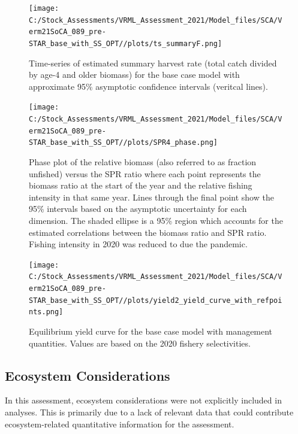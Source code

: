 \documentclass[11pt,
  english,
  a4paper,
]{article}
\begin{document}
\begin{figure}
\centering
\texttt{[image: C:/Stock\_Assessments/VRML\_Assessment\_2021/Model\_files/SCA/Verm21SoCA\_089\_pre-STAR\_base\_with\_SS\_OPT//plots/ts\_summaryF.png]}
\caption{Time-series of estimated summary harvest rate (total catch divided by age-4 and older biomass) for the base case model with approximate 95\% asymptotic confidence intervals (veritcal lines).\label{fig:FmortalityES}}
\end{figure}

\begin{figure}
\centering
\texttt{[image: C:/Stock\_Assessments/VRML\_Assessment\_2021/Model\_files/SCA/Verm21SoCA\_089\_pre-STAR\_base\_with\_SS\_OPT//plots/SPR4\_phase.png]}
\caption{Phase plot of the relative biomass (also referred to as fraction unfished) versus the SPR ratio where each point represents the biomass ratio at the start of the year and the relative fishing intensity in that same year. Lines through the final point show the 95\% intervals based on the asymptotic uncertainty for each dimension. The shaded ellipse is a 95\% region which accounts for the estimated correlations between the biomass ratio and SPR ratio. Fishing intensity in 2020 was reduced to due the pandemic.\label{fig:phaseES}}
\end{figure}

\begin{figure}
\centering
\texttt{[image: C:/Stock\_Assessments/VRML\_Assessment\_2021/Model\_files/SCA/Verm21SoCA\_089\_pre-STAR\_base\_with\_SS\_OPT//plots/yield2\_yield\_curve\_with\_refpoints.png]}
\caption{Equilibrium yield curve for the base case model with management quantities. Values are based on the 2020 fishery selectivities.\label{fig:yield2ES}}
\end{figure}

\FloatBarrier


\hypertarget{ecosystem-considerations}{%
\subsection*{Ecosystem Considerations}\label{ecosystem-considerations}}

\leavevmode\tagmcend\tagstructend

In this assessment, ecosystem considerations were not explicitly included in analyses. This is primarily due to a lack of relevant data that could contribute ecosystem-related quantitative information for the assessment.
\end{document}
